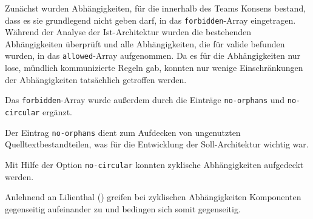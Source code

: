 Zunächst wurden Abhängigkeiten, für die innerhalb des Teams Konsens bestand, dass es sie grundlegend nicht geben darf, in das \lstinline|forbidden|-Array eingetragen. Während der Analyse der Ist-Architektur wurden die bestehenden Abhängigkeiten überprüft und alle Abhängigkeiten, die für valide befunden wurden, in das \lstinline|allowed|-Array aufgenommen. Da es für die Abhängigkeiten nur lose, mündlich kommunizierte Regeln gab, konnten nur wenige Einschränkungen der Abhängigkeiten tatsächlich getroffen werden.  

Das \lstinline|forbidden|-Array wurde außerdem durch die Einträge 
\lstinline|no-orphans| und \lstinline|no-circular| ergänzt.

Der Eintrag \lstinline|no-orphans| dient zum Aufdecken von ungenutzten Quelltextbestandteilen, was für die Entwicklung der Soll-Architektur wichtig war.

Mit Hilfe der Option \lstinline|no-circular| konnten zyklische Abhängigkeiten aufgedeckt werden.

Anlehnend an Lilienthal (\citeyear[vgl.][88 - 90]{Lilienthal2019}) greifen bei zyklischen Abhängigkeiten Komponenten gegenseitig aufeinander zu und bedingen sich somit gegenseitig. 

